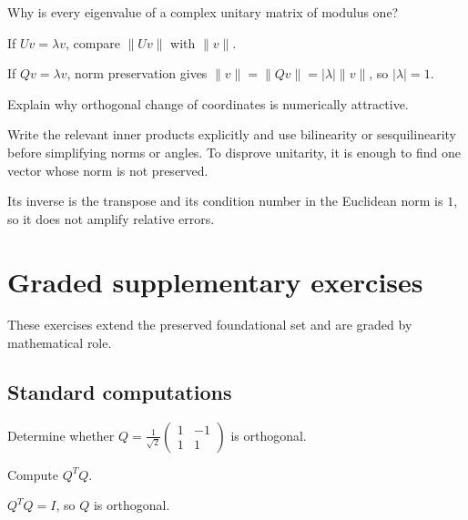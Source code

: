\begin{exercise}\label{exr:i15-07}
Why is every eigenvalue of a complex unitary matrix of modulus one?
\end{exercise}
\begin{hint}
If \(Uv=\lambda v\), compare \(\|Uv\|\) with \(\|v\|\).
\end{hint}
\begin{solution}
If $Qv=\lambda v$, norm preservation gives $\|v\|=\|Qv\|=|\lambda|\|v\|$, so $|\lambda|=1$.
\end{solution}

\begin{exercise}\label{exr:i15-08}
Explain why orthogonal change of coordinates is numerically attractive.
\end{exercise}
\begin{hint}
Write the relevant inner products explicitly and use bilinearity or sesquilinearity before simplifying norms or angles. To disprove unitarity, it is enough to find one vector whose norm is not preserved.
\end{hint}
\begin{solution}
Its inverse is the transpose and its condition number in the Euclidean norm is $1$, so it does not amplify relative errors.
\end{solution}


\section{Graded supplementary exercises}
These exercises extend the preserved foundational set and are graded by mathematical role.

\subsection*{Standard computations}

\begin{exercise}\label{exr:i15-expand-01}
Determine whether \(Q=\frac1{\sqrt2}\begin{pmatrix}1&-1\\1&1\end{pmatrix}\) is orthogonal.
\end{exercise}
\begin{hint}
Compute \(Q^TQ\).
\end{hint}
\begin{solution}
\(Q^TQ=I\), so \(Q\) is orthogonal.
\end{solution}

